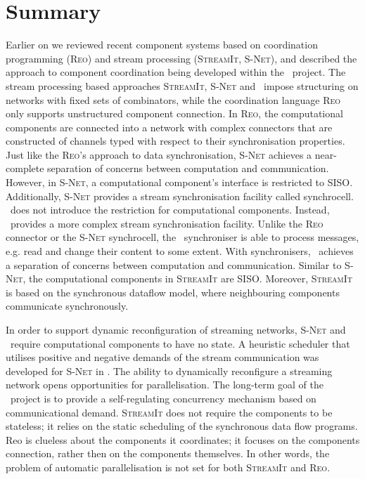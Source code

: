     \section{Summary}
Earlier on we reviewed recent component systems based on coordination programming (\textsc{Reo}) and stream processing (\textsc{StreamIt, S-Net}), and described the approach to component coordination being developed within the \ak\ project. The stream processing based approaches \textsc{StreamIt}, \textsc{S-Net} and \ak\ impose structuring on networks with fixed sets of combinators, while the coordination language \textsc{Reo} only supports unstructured component connection. In \textsc{Reo}, the computational components are connected into a network with complex connectors that are constructed of channels typed with respect to their synchronisation properties. Just like the \textsc{Reo}'s approach to data synchronisation, \textsc{S-Net} achieves a near-complete separation of concerns between computation and communication. However, in \textsc{S-Net}, a computational component's interface is restricted to SISO. Additionally, \textsc{S-Net} provides a stream synchronisation facility called synchrocell. \ak\ does not introduce the restriction for computational components. Instead, \ak\ provides a more complex stream synchronisation facility. Unlike the \textsc{Reo} connector or the \textsc{S-Net} synchrocell, the \ak\ synchroniser is able to process messages, e.g. read and change their content to some extent. With synchronisers, \ak\ achieves a separation of concerns between computation and communication. Similar to \textsc{S-Net}, the computational components in \textsc{StreamIt} are SISO. Moreover, \textsc{StreamIt} is based on the synchronous dataflow model, where neighbouring components communicate synchronously.

In order to support dynamic reconfiguration of streaming networks, \textsc{S-Net} and \ak\ require computational components to have no state. A heuristic scheduler that utilises positive and negative demands of the stream communication was developed for \textsc{S-Net} in \cite{nga}. The ability to dynamically reconfigure a streaming network opens opportunities for parallelisation. The long-term goal of the \ak\ project is to provide a self-regulating concurrency mechanism based on communicational demand. \textsc{StreamIt} does not require the components to be stateless; it relies on the static scheduling of the synchronous data flow programs. Reo is clueless about the components it coordinates; it focuses on the components connection, rather then on the components themselves. In other words, the problem of automatic parallelisation is not set for both \textsc{StreamIt} and \textsc{Reo}.
%
%
